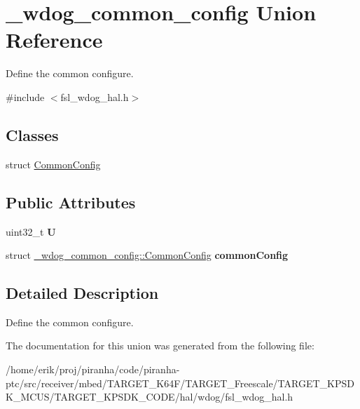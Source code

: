 \hypertarget{union__wdog__common__config}{}\section{\+\_\+wdog\+\_\+common\+\_\+config Union Reference}
\label{union__wdog__common__config}


Define the common configure.  




{\ttfamily \#include $<$fsl\+\_\+wdog\+\_\+hal.\+h$>$}

\subsection*{Classes}
\begin{DoxyCompactItemize}
\item 
struct \hyperlink{struct__wdog__common__config_1_1CommonConfig}{Common\+Config}
\end{DoxyCompactItemize}
\subsection*{Public Attributes}
\begin{DoxyCompactItemize}
\item 
uint32\+\_\+t {\bfseries U}\hypertarget{union__wdog__common__config_af256a42eea22b72d8618bb626348c53f}{}\label{union__wdog__common__config_af256a42eea22b72d8618bb626348c53f}

\item 
struct \hyperlink{struct__wdog__common__config_1_1CommonConfig}{\+\_\+wdog\+\_\+common\+\_\+config\+::\+Common\+Config} {\bfseries common\+Config}\hypertarget{union__wdog__common__config_abda598ff65ad563769089907016b8641}{}\label{union__wdog__common__config_abda598ff65ad563769089907016b8641}

\end{DoxyCompactItemize}


\subsection{Detailed Description}
Define the common configure. 

The documentation for this union was generated from the following file\+:\begin{DoxyCompactItemize}
\item 
/home/erik/proj/piranha/code/piranha-\/ptc/src/receiver/mbed/\+T\+A\+R\+G\+E\+T\+\_\+\+K64\+F/\+T\+A\+R\+G\+E\+T\+\_\+\+Freescale/\+T\+A\+R\+G\+E\+T\+\_\+\+K\+P\+S\+D\+K\+\_\+\+M\+C\+U\+S/\+T\+A\+R\+G\+E\+T\+\_\+\+K\+P\+S\+D\+K\+\_\+\+C\+O\+D\+E/hal/wdog/fsl\+\_\+wdog\+\_\+hal.\+h\end{DoxyCompactItemize}
